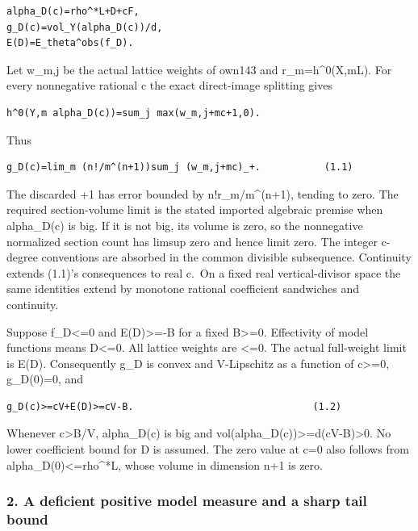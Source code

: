 \documentclass[
  10pt,
]{article}
\begin{document}
\begin{verbatim}
alpha_D(c)=rho^*L+D+cF,
g_D(c)=vol_Y(alpha_D(c))/d,
E(D)=E_theta^obs(f_D).
\end{verbatim}

Let w\_m,j be the actual lattice weights of own143 and
r\_m=h\^{}0(X,mL). For every nonnegative rational c the exact
direct-image splitting gives

\begin{verbatim}
h^0(Y,m alpha_D(c))=sum_j max(w_m,j+mc+1,0).
\end{verbatim}

Thus

\begin{verbatim}
g_D(c)=lim_m (n!/m^(n+1))sum_j (w_m,j+mc)_+.           (1.1)
\end{verbatim}

The discarded +1 has error bounded by n!r\_m/m\^{}(n+1), tending to
zero. The required section-volume limit is the stated imported algebraic
premise when alpha\_D(c) is big. If it is not big, its volume is zero,
so the nonnegative normalized section count has limsup zero and hence
limit zero. The integer c-degree conventions are absorbed in the common
divisible subsequence. Continuity extends (1.1)'s consequences to real
c.~On a fixed real vertical-divisor space the same identities extend by
monotone rational coefficient sandwiches and continuity.

Suppose f\_D\textless=0 and E(D)\textgreater=-B for a fixed
B\textgreater=0. Effectivity of model functions means D\textless=0. All
lattice weights are \textless=0. The actual full-weight limit is E(D).
Consequently g\_D is convex and V-Lipschitz as a function of
c\textgreater=0, g\_D(0)=0, and

\begin{verbatim}
g_D(c)>=cV+E(D)>=cV-B.                               (1.2)
\end{verbatim}

Whenever c\textgreater B/V, alpha\_D(c) is big and
vol(alpha\_D(c))\textgreater=d(cV-B)\textgreater0. No lower coefficient
bound for D is assumed. The zero value at c=0 also follows from
alpha\_D(0)\textless=rho\^{}*L, whose volume in dimension n+1 is zero.

\subsubsection{2. A deficient positive model measure and a sharp tail
bound}\label{a-deficient-positive-model-measure-and-a-sharp-tail-bound}
\end{document}
